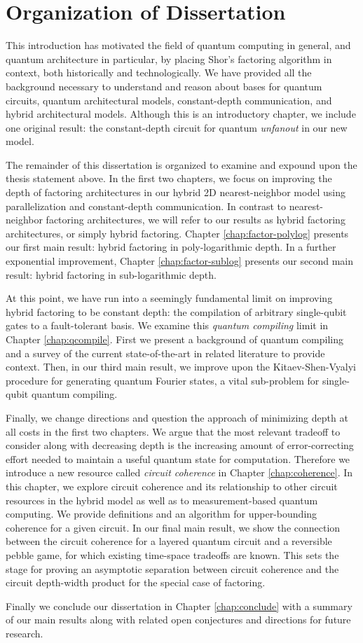 \section{Organization of Dissertation}
\label{sec:intro-conclude}

This introduction has motivated the field of quantum computing in
general, and quantum architecture in particular, by placing
Shor's factoring algorithm in context, both historically and
technologically. We have provided all the background necessary
to understand and reason about bases for quantum circuits,
quantum architectural models, constant-depth communication,
and hybrid architectural models. Although this is an
introductory chapter, we include one original result:
the constant-depth circuit for
quantum \emph{unfanout} in our new model.

The remainder of this dissertation is organized to
examine and expound upon the thesis statement above. In the first two
chapters, we focus on improving the depth of factoring architectures
in our hybrid 2D nearest-neighbor model using parallelization and
constant-depth communication. In contrast to nearest-neighbor factoring
architectures, we will refer to our results as hybrid factoring architectures,
or simply hybrid factoring.
Chapter \ref{chap:factor-polylog} presents our first main result:
hybrid factoring in poly-logarithmic depth.
In a further exponential improvement, Chapter \ref{chap:factor-sublog} presents 
our second main result: hybrid factoring in sub-logarithmic depth.

At this point, we have run into a seemingly fundamental limit on improving
hybrid factoring to be constant depth: the compilation of arbitrary
single-qubit gates to a fault-tolerant basis. We examine this
\emph{quantum compiling} limit in Chapter \ref{chap:qcompile}. First we
present a background of quantum compiling and a survey of the current
state-of-the-art in related literature to provide context. Then, in our
third main result, we improve
upon the Kitaev-Shen-Vyalyi procedure for generating quantum Fourier states,
a vital sub-problem for single-qubit quantum compiling.

Finally, we change directions and question the approach of minimizing depth
at all costs in the first two chapters. We argue that the most relevant
tradeoff to consider along with decreasing depth is the increasing amount
of error-correcting effort needed to maintain a useful quantum state for
computation. Therefore we introduce a new resource called
\emph{circuit coherence} in Chapter \ref{chap:coherence}. In this chapter,
we explore circuit coherence and its relationship to other circuit resources
in the hybrid model as well as to measurement-based quantum computing.
We provide definitions and an algorithm for upper-bounding coherence for
a given circuit. In our final
main result, we show the connection between the circuit coherence for a
layered quantum circuit and a reversible pebble game, for which existing
time-space tradeoffs are known. This sets the stage for proving an
asymptotic separation between circuit coherence and the circuit
depth-width product for the special case of factoring.

Finally we conclude our dissertation in Chapter \ref{chap:conclude} with a
summary of our main results along with related open conjectures and
directions for future research.